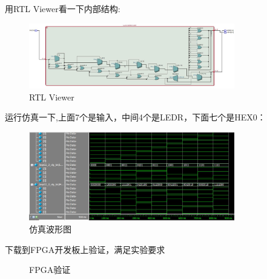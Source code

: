 \documentclass[12pt,a4paper,UTF8]{article}
\begin{document}
用RTL Viewer看一下内部结构:
\begin{figure}[H]
  \centering
  \includegraphics[width=0.8\textwidth]{2_3RTL.JPG}
  \caption{RTL Viewer}
  \label{8to3_RTL}
\end{figure}

运行仿真一下,上面7个是输入，中间4个是LEDR，下面七个是HEX0：
\begin{figure}[H]
  \centering
  \includegraphics[width=0.8\textwidth]{2_3sim.JPG}
  \caption{仿真波形图}
  \label{8to3_sim}
\end{figure}

下载到FPGA开发板上验证，满足实验要求
\begin{figure}[H]
  \centering
  \caption{FPGA验证}
  \label{fpga}
\end{figure}
\end{document}
